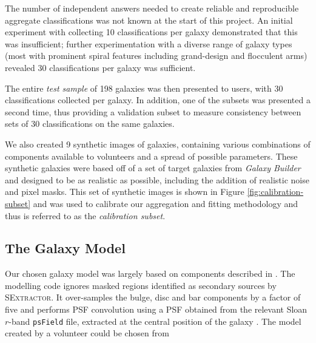 \documentclass[trackchanges]{aastex63}
\begin{document}
The number of independent answers needed to create reliable and reproducible aggregate classifications was not known at the start of this project. An initial experiment with collecting 10 classifications per galaxy demonstrated that this was insufficient; further experimentation with a diverse range of galaxy types (most with prominent spiral features including grand-design and flocculent arms) revealed 30 classifications per galaxy was sufficient.

The entire {\it test sample} of 198 galaxies was then presented to users, with 30 classifications collected per galaxy. In addition, one of the subsets was presented a second time, thus providing a validation subset to measure consistency between sets of 30 classifications on the same galaxies.

We also created 9 synthetic images of galaxies, containing various combinations of components available to volunteers and a spread of possible parameters. These synthetic galaxies were based off of a set of target galaxies from \textit{Galaxy Builder} and designed to be as realistic as possible, including the addition of realistic noise and pixel masks. This set of synthetic images is shown in Figure \ref{fig:calibration-subset} and was used to calibrate our aggregation and fitting methodology and thus is referred to as the \textit{calibration subset}.

\begin{figure*}
  \caption{Arcsinh-stretched images of the synthetic galaxies present in the \textit{calibration subset}. These galaxies were designed to look as realistic as possible, while being described perfectly by the model available to volunteers.}
  \label{fig:calibration-subset}
\end{figure*}

\subsection{The Galaxy Model}
\label{section:galaxy-model}

Our chosen galaxy model was largely based on components described in \citet{galfit-paper}. The modelling code ignores masked regions identified as secondary sources by \textsc{SExtractor}. It over-samples the bulge, disc and bar components by a factor of five and performs PSF convolution using a PSF obtained from the relevant Sloan $r$-band \texttt{psField} file, extracted at the central position of the galaxy \citep{2002AJ....123..485S}. The model created by a volunteer could be chosen from
\end{document}
